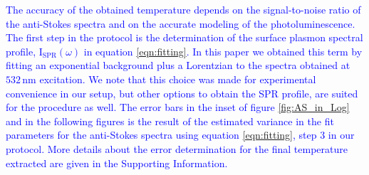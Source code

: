 \documentclass[journal=nalefd,manuscript=letter]{achemso}
\newcommand{\HI}[1]{\textcolor{blue}{#1}} %
\newcommand{\nm}{\ensuremath{\,\textrm{nm}}}
\begin{document}
\HI{The accuracy of the obtained temperature depends on the signal-to-noise ratio of the 
anti-Stokes spectra and on the accurate modeling of the photoluminescence.
The first step in the protocol is the determination
of the surface plasmon spectral profile, $\textrm{I}_\textrm{SPR}(\omega)$ in equation \ref{eqn:fitting}. 
In this paper we obtained this term by fitting an exponential background plus a Lorentzian to the spectra
obtained at $532\nm$ excitation. We note
that this choice was made for experimental convenience in our setup, but other options to
obtain the SPR profile, are suited for the procedure as well.}
\HI{The error bars in the inset of figure \ref{fig:AS_in_Log} and in the following figures 
is the result of the estimated variance in the fit parameters for the 
anti-Stokes spectra using equation \ref{eqn:fitting}, step 3 in our protocol. More details
about the error determination for the final temperature extracted are given in the Supporting
Information.}
\end{document}
